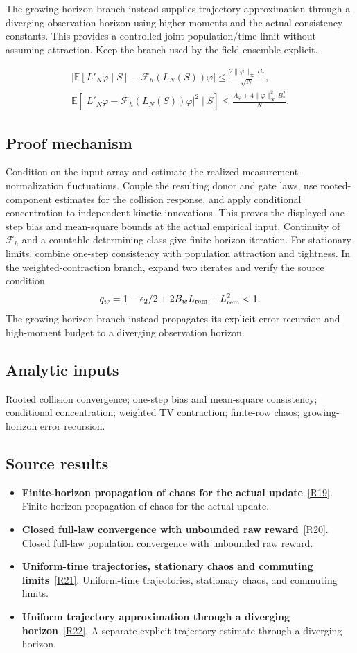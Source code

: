 \documentclass[11pt,a4paper]{article}
\begin{document}
The growing-horizon branch instead supplies trajectory approximation through a diverging observation horizon using higher moments and the actual consistency constants. This provides a controlled joint population/time limit without assuming attraction. Keep the branch used by the field ensemble explicit.


\begin{gather*}
\left|\mathbb E[L'_N\varphi\mid S]-\mathcal F_h(L_N(S))\varphi\right|
\le\frac{2\|\varphi\|_\infty B_*}{\sqrt N},\\
\mathbb E\!\left[|L'_N\varphi-\mathcal F_h(L_N(S))\varphi|^2\mid S\right]
\le\frac{A_\varphi+4\|\varphi\|_\infty^2B_*^2}{N}.
\end{gather*}
\subsection*{Proof mechanism}
Condition on the input array and estimate the realized measurement-normalization fluctuations. Couple the resulting donor and gate laws, use rooted-component estimates for the collision response, and apply conditional concentration to independent kinetic innovations. This proves the displayed one-step bias and mean-square bounds at the actual empirical input. Continuity of \(\mathcal F_h\) and a countable determining class give finite-horizon iteration. For stationary limits, combine one-step consistency with population attraction and tightness. In the weighted-contraction branch, expand two iterates and verify the source condition
\[q_w=1-\epsilon_2/2+2B_wL_{\rm rem}+L_{\rm rem}^2<1.\]
The growing-horizon branch instead propagates its explicit error recursion and high-moment budget to a diverging observation horizon.
\subsection*{Analytic inputs}
Rooted collision convergence; one-step bias and mean-square consistency; conditional concentration; weighted TV contraction; finite-row chaos; growing-horizon error recursion.
\subsection*{Source results}
\begin{itemize}
\item \textbf{Finite-horizon propagation of chaos for the actual update}~\hyperref[src:thm-chaos-finite-time-consistency]{[R19]}. Finite-horizon propagation of chaos for the actual update.
\item \textbf{Closed full-law convergence with unbounded raw reward}~\hyperref[src:thm-slcw-active-contraction]{[R20]}. Closed full-law population convergence with unbounded raw reward.
\item \textbf{Uniform-time trajectories, stationary chaos and commuting limits}~\hyperref[src:cor-slcw-trajectories]{[R21]}. Uniform-time trajectories, stationary chaos, and commuting limits.
\item \textbf{Uniform trajectory approximation through a diverging horizon}~\hyperref[src:thm-slcgt-growing-trajectory]{[R22]}. A separate explicit trajectory estimate through a diverging horizon.
\end{itemize}
\end{document}
